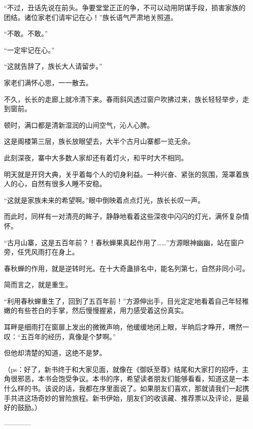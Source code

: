 \begin{this_body}
“不过，丑话先说在前头。争要堂堂正正的争，不可以动用阴谋手段，损害家族的团结。诸位家老们请牢记在心！”族长语气严肃地关照道。

“不敢。不敢。”

“一定牢记在心。”

“这就告辞了，族长大人请留步。”

家老们满怀心思，一一散去。

不久，长长的走廊上就冷清下来。春雨斜风透过窗户吹拂过来，族长轻轻举步，走到窗前。

顿时，满口都是清新湿润的山间空气，沁人心脾。

这是阁楼第三层，族长放眼望去，大半个古月山寨都一览无余。

此刻深夜，寨中大多数人家却还有着灯火，和平时大不相同。

明天就是开窍大典，关乎着每个人的切身利益。一种兴奋、紧张的氛围，笼罩着族人的心，自然有很多人睡不安稳。

“这就是家族未来的希望啊。”眼中倒映着点点灯光，族长长叹一声。

而此时，同样有一对清亮的眸子，静静地看着这些深夜中闪闪的灯光，满怀复杂情怀。

“古月山寨，这是五百年前？！春秋蝉果真起作用了……”方源眼神幽幽，站在窗户旁，任凭风雨打在身上。

春秋蝉的作用，就是逆转时光。在十大奇蛊排名中，能名列第七，自然非同小可。

简而言之，就是重生。

“利用春秋蝉重生了，回到了五百年前！”方源伸出手，目光定定地看着自己年轻稚嫩的有些苍白的手掌，然后慢慢握紧，用力感受着这份真实。

耳畔是细雨打在窗扉上发出的微微声响，他缓缓地闭上眼，半晌后才睁开，喟然一叹：“五百年的经历，真像是个梦啊。”

但他却清楚的知道，这绝不是梦。

（ps：好了，新书终于和大家见面，就像在《御妖至尊》结尾和大家打的招呼，主角很邪恶，本书会饱受争议。本书的序，希望读者朋友们能够看看，知道这是一本什么样的书。该说的话，我都在序里面说了。如果朋友们喜欢，那就请我们一起携手共进这场奇妙的冒险旅程。新书伊始，朋友们的收该藏、推荐票以及评论，是最好的鼓励。）

------------

\end{this_body}

